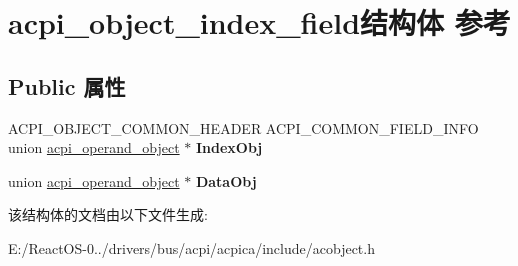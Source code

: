 \hypertarget{structacpi__object__index__field}{}\section{acpi\+\_\+object\+\_\+index\+\_\+field结构体 参考}
\label{structacpi__object__index__field}
\subsection*{Public 属性}
\begin{DoxyCompactItemize}
\item 
\mbox{\label{structacpi__object__index__field_a98104f43353228c85d619aa1c8f11d52}} 
A\+C\+P\+I\+\_\+\+O\+B\+J\+E\+C\+T\+\_\+\+C\+O\+M\+M\+O\+N\+\_\+\+H\+E\+A\+D\+ER A\+C\+P\+I\+\_\+\+C\+O\+M\+M\+O\+N\+\_\+\+F\+I\+E\+L\+D\+\_\+\+I\+N\+FO union \hyperlink{unionacpi__operand__object}{acpi\+\_\+operand\+\_\+object} $\ast$ {\bfseries Index\+Obj}
\item 
\mbox{\label{structacpi__object__index__field_afb105298151a1e6e6a0b92623e25e638}} 
union \hyperlink{unionacpi__operand__object}{acpi\+\_\+operand\+\_\+object} $\ast$ {\bfseries Data\+Obj}
\end{DoxyCompactItemize}


该结构体的文档由以下文件生成\+:\begin{DoxyCompactItemize}
\item 
E\+:/\+React\+O\+S-\/0../drivers/bus/acpi/acpica/include/acobject.\+h\end{DoxyCompactItemize}
